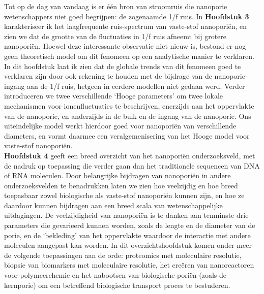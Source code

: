 {	
	\noindent Tot op de dag van vandaag is er één bron van stroomruis die nanoporie wetenschappers niet goed begrijpen: de zogenaamde 1/f ruis. In \textbf{Hoofdstuk 3} karakteriseer ik het laagfrequente ruis-spectrum van vaste-stof nano\-poriën, en zien we dat de grootte van de fluctuaties in 1/f ruis afneemt bij grotere nano\-poriën. Hoewel deze interessante observatie niet nieuw is, bestond er nog geen theoretisch model om dit fenomeen op een analytische manier te verklaren. In dit hoofdstuk laat ik zien dat de globale trends van dit fenomeen goed te verklaren zijn door ook rekening te houden met de bijdrage van de nanoporie-ingang aan de 1/f ruis, hetgeen in eerdere modellen niet gedaan werd. Verder introduceren we twee verschillende `Hooge parameters' om twee lokale mechanismen voor ionenfluctuaties te beschrijven, enerzijds aan het oppervlakte van de nanoporie, en anderzijds in de bulk en de ingang van de nanoporie. Ons uiteindelijke model werkt hierdoor goed voor nano\-poriën van verschillende diameters, en vormt daarmee een veralgemenisering van het Hooge model voor vaste-stof nano\-poriën.\\[0.5pt]
	
	\noindent \textbf{Hoofdstuk 4} geeft een breed overzicht van het nano\-poriën onderzoeksveld, met de nadruk op toepassing die verder gaan dan het traditionele sequencen van DNA of RNA moleculen. Door belangrijke bijdragen van nano\-poriën in andere onderzoeksvelden te benadrukken laten we zien hoe veelzijdig en hoe breed toepasbaar zowel biologische als vaste-stof nano\-poriën kunnen zijn, en hoe ze daardoor kunnen bijdragen aan een breed scala van wetenschappelijke uitdagingen. De veelzijdigheid van nano\-poriën is te danken aan tenminste drie parameters die gevarieerd kunnen worden, zoals de lengte en de diameter van de porie, en de `bekleding' van het oppervlakte waardoor de interactie met andere moleculen aangepast kan worden. In dit overzichtshoofdstuk komen onder meer de volgende toepassingen aan de orde: proteomics met moleculaire resolutie, biopsie van biomarkers met moleculaire resolutie, het creëren van nanoreactoren voor polymeerchemie en het nabootsen van biologische poriën (zoals de kernporie) om een betreffend biologische transport proces te bestuderen.\\[0.5pt]
	
}
